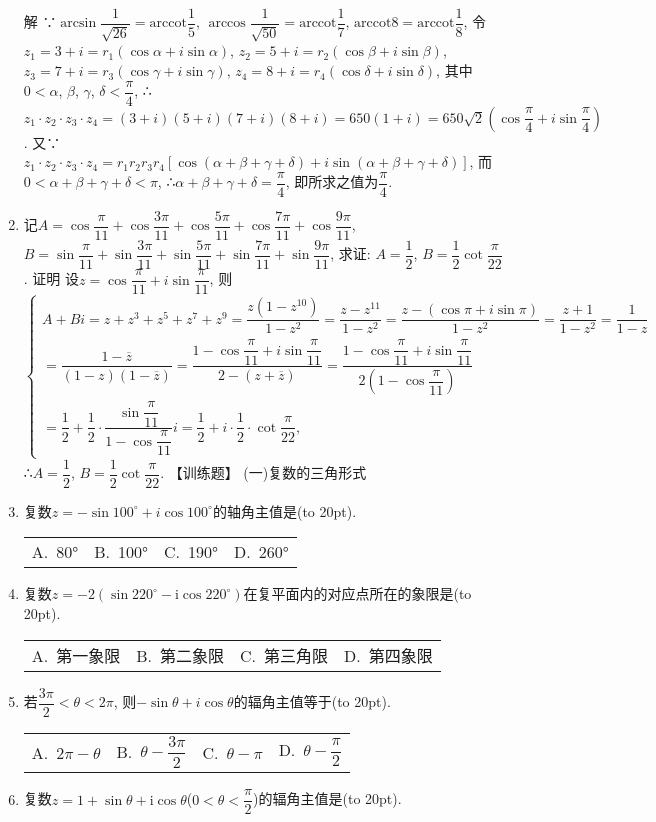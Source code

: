 \documentclass[10pt,a4paper]{article}
\newcommand{\bracket}[1]{(\hbox to #1pt{})}
\newcommand{\fourch}[4]{\par\begin{tabular}{p{.23\textwidth}p{.23\textwidth}p{.23\textwidth}p{.23\textwidth}}
A.~#1 &B.~#2& C.~#3& D.~#4
\end{tabular}}
\begin{document}
\begin{enumerate}[1.]
解  ∵$\arcsin \dfrac 1{\sqrt {26}}=\mathrm{arccot} \dfrac 15$, $\arccos \dfrac 1{\sqrt {50}}=\mathrm{arccot} \dfrac 17$, $\mathrm{arccot} 8=\mathrm{arccot} \dfrac 18$,
令$z_1=3+i=r_1(\cos \alpha +i\sin \alpha)$, $z_2=5+i=r_2(\cos \beta +i\sin \beta)$,
$z_3=7+i=r_3(\cos \gamma +i\sin \gamma)$, $z_4=8+i=r_4(\cos \delta +i\sin \delta)$, 其中$0<\alpha$, $\beta$, $\gamma$, $\delta <\dfrac{\pi }4$,
∴$z_1\cdot z_2\cdot z_3\cdot z_4=(3+i)(5+i)(7+i)(8+i)=650(1+i)=650\sqrt 2(\cos \dfrac{\pi }4+i\sin \dfrac{\pi }4)$.
又∵$z_1\cdot z_2\cdot z_3\cdot z_4=r_1r_2r_3r_4[\cos (\alpha +\beta +\gamma +\delta)+i\sin (\alpha +\beta +\gamma +\delta)]$,
而$0<\alpha +\beta +\gamma +\delta <\pi$, ∴$\alpha +\beta +\gamma +\delta =\dfrac{\pi }4$, 即所求之值为$\dfrac{\pi }4$.
\item 记$A=\cos \dfrac{\pi }{11}+\cos \dfrac{3\pi }{11}+\cos \dfrac{5\pi }{11}+\cos \dfrac{7\pi }{11}+\cos \dfrac{9\pi }{11}$, $B=\sin \dfrac{\pi }{11}+\sin \dfrac{3\pi }{11}+\sin \dfrac{5\pi }{11}+\sin \dfrac{7\pi }{11}+\sin \dfrac{9\pi }{11}$, 求证: $A=\dfrac 12$, $B=\dfrac 12\cot \dfrac{\pi }{22}$.
证明  设$z=\cos \dfrac{\pi }{11}+i\sin \dfrac{\pi }{11}$, 则
$\begin{cases} A+Bi=z+z^3+z^5+z^7+z^9=\dfrac{z(1-{z^{10}})}{1-{z^2}}=\dfrac{z-{z^{11}}}{1-{z^2}}=\dfrac{z-(\cos \pi +i\sin \pi)}{1-{z^2}}=\dfrac{z+1}{1-{z^2}}=\dfrac 1{1-z} \\ =\dfrac{1-\overline z}{(1-z)(1-\overline z)}=\dfrac{1-\cos \dfrac{\pi }{11}+i\sin \dfrac{\pi }{11}}{2-(z+\overline z)}=\dfrac{1-\cos \dfrac{\pi }{11}+i\sin \dfrac{\pi }{11}}{2(1-\cos \dfrac{\pi }{11})} \\ =\dfrac 12+\dfrac 12\cdot \dfrac{\sin \dfrac{\pi }{11}}{1-\cos \dfrac{\pi }{11}}i=\dfrac 12+i\cdot \dfrac 12\cdot \cot \dfrac{\pi }{22},
\end{cases}$
∴$A=\dfrac 12$, $B=\dfrac 12\cot \dfrac{\pi }{22}$.
【训练题】
(一)复数的三角形式
\item 复数$z=-\sin 100^\circ +i\cos 100^\circ$的轴角主值是\bracket{20}.
\fourch{80°}{100°}{190°}{260°}
\item 复数$z=-2(\sin 220^\circ -\mathrm{i}\cos 220^\circ)$在复平面内的对应点所在的象限是\bracket{20}.
\fourch{第一象限}{第二象限}{第三角限}{第四象限}
\item 若$\dfrac{3\pi }2<\theta <2\pi$, 则$-\sin \theta +i\cos \theta$的辐角主值等于\bracket{20}.
\fourch{$2\pi -\theta$}{$\theta -\dfrac{3\pi }2$}{$\theta -\pi$}{$\theta -\dfrac{\pi }2$}
\item 复数$z=1+\sin \theta +\mathrm{i}\cos \theta$($0<\theta <\dfrac{\pi }2$)的辐角主值是\bracket{20}.

\end{enumerate}
\end{document}
